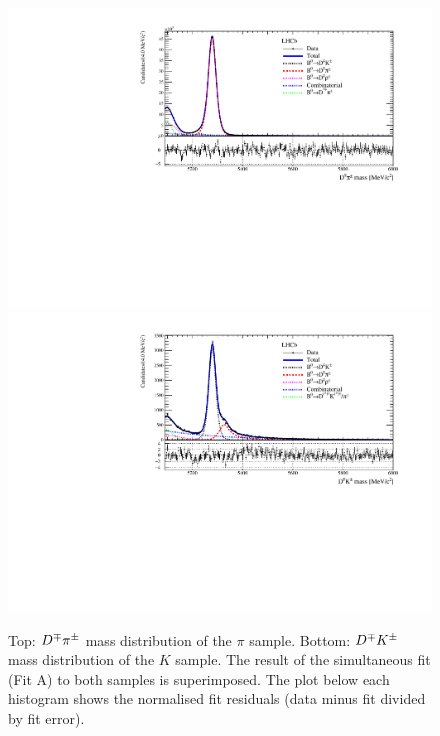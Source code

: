 \begin{figure}
	\begin{center}
		\includegraphics[width=\columnwidth]{03Massfit/figs/MDFitPlots_Bd/MDFit_BeautyMass_Bd2DPi_withPulls.pdf} \\
		\vspace{5mm}
                \includegraphics[width=\columnwidth]{03Massfit/figs/MDFitPlots_Bd/MDFit_BeautyMass_Bd2DK_withPulls.pdf}
	\end{center}
        \vspace{-2mm}
	\caption{Top: $D^\mp\pi^\pm$ mass distribution of the $\pi$ sample. Bottom: $D^\mp K^\pm$ mass distribution of the $K$ sample. 
		     The result of the simultaneous fit (Fit A) to both samples is superimposed.
		     The plot below each histogram shows the normalised fit residuals (data minus fit divided by fit error).}
	\label{fig:FitA}
\end{figure}

